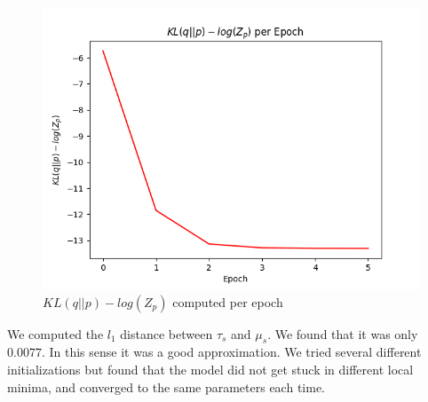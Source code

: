 \documentclass[paper=a4, fontsize=11pt]{scrartcl} %
\numberwithin{equation}{section} %
\numberwithin{figure}{section} %
\numberwithin{table}{section} %
\begin{document}
\begin{enumerate}[(a)]
	\begin{figure}
		\includegraphics[width=.9\linewidth]{per_epoch.png}
		\caption{$KL(q||p) - log(Z_p)$ computed per epoch}
	\end{figure}
	
	We computed the $l_1$ distance between $\tau_s$ and $\mu_s$. We found that it was only $0.0077$. In this sense it was a good approximation. We tried several different initializations but found that the model did not get stuck in different local minima, and converged to the same parameters each time.
	
\end{enumerate}
\end{document}
